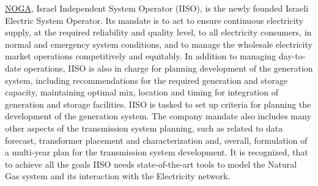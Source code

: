 \href{https://www.noga-iso.co.il/en/}{NOGA}, Israel Independent System Operator (IISO), is the newly founded Israeli Electric System Operator. Its mandate is to act to ensure continuous electricity supply, at the required reliability and quality level, to all electricity consumers, in normal and emergency system conditions, and to manage the wholesale electricity market operations competitively and equitably. In addition to managing day-to-date operations, IISO is also in charge for planning development of the generation system, including recommendations for the required generation and storage capacity, maintaining optimal mix, location and timing for integration of generation and storage facilities. IISO is tasked to set up %
criteria for planning the development of the generation system. The company mandate also includes many other aspects of the transmission system planning, such as related to data forecast, transformer placement and characterization and, overall, formulation of a multi-year plan for the transmission system development. It is recognized, that to achieve all the goals IISO needs state-of-the-art tools to model the Natural Gas system and its interaction with the Electricity network.



